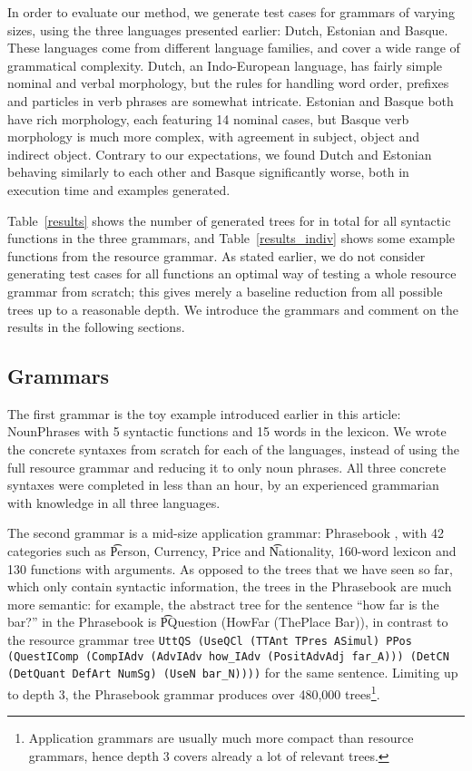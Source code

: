 In order to evaluate our method, we generate test cases for grammars
of varying sizes, using the three languages presented earlier: Dutch,
Estonian and Basque. These languages come from different language
families, and cover a wide range of grammatical complexity. Dutch, an
Indo-European language, has fairly simple nominal and verbal
morphology, but the rules for handling word order, prefixes and
particles in verb phrases are somewhat intricate. Estonian and Basque
both have rich morphology, each featuring 14 nominal cases, but Basque
verb morphology is much more complex, with agreement in subject,
object and indirect object. Contrary to our expectations, we found
Dutch and Estonian behaving similarly to each other and Basque
significantly worse, both in execution time and examples generated.

Table~\ref{results} shows the number of generated trees for 
in total for all syntactic functions in the three grammars, and
Table~\ref{results_indiv} shows some example functions from the resource grammar. 
As stated earlier, we do not consider generating test cases for all
functions an optimal way of testing a whole resource grammar from scratch;
this gives merely a baseline reduction from all possible trees up to a
reasonable depth. We introduce the grammars and comment on the results
in the following sections. 

\subsection{Grammars}

The first grammar is the toy example introduced earlier in this
article: NounPhrases with 5 syntactic functions and 15 words in the
lexicon. We wrote the concrete syntaxes from scratch for each of the
languages, instead of using the full resource grammar and reducing it
to only noun phrases. All three concrete syntaxes were completed
in less than an hour, by an experienced grammarian with knowledge in
all three languages.

The second grammar is a mid-size application grammar: Phrasebook
\cite{ranta2010phrasebook}, with 42 categories such as \t{Person,
  Currency, Price} and \t{Nationality}, 160-word lexicon and 130
functions with arguments. As opposed to the trees that we have seen so far,
which only contain syntactic information, the trees in the Phrasebook
are much more semantic: for example, the abstract tree for the
sentence ``how far is the bar?'' in the Phrasebook is \t{PQuestion
  (HowFar (ThePlace Bar))}, in contrast to the resource grammar tree
{\tt \small UttQS (UseQCl (TTAnt TPres ASimul) PPos (QuestIComp
  (CompIAdv (AdvIAdv how\_IAdv (PositAdvAdj far\_A))) 
  (DetCN (DetQuant DefArt NumSg) (UseN bar\_N))))} for the same
sentence. Limiting up to depth 3, the Phrasebook grammar produces over
480,000 trees\footnote{Application grammars are usually
much more compact than resource grammars, hence depth 3 covers already
a lot of relevant trees.}.

